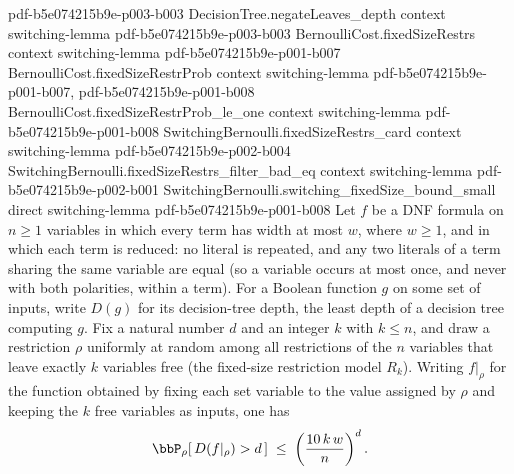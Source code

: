 \begin{lemma}
  {pdf-b5e074215b9e-p003-b003}
\proofstep
  {DecisionTree.negateLeaves_depth}
  {context}
  {switching-lemma}
  {pdf-b5e074215b9e-p003-b003}
\proofstep
  {BernoulliCost.fixedSizeRestrs}
  {context}
  {switching-lemma}
  {pdf-b5e074215b9e-p001-b007}
\proofstep
  {BernoulliCost.fixedSizeRestrProb}
  {context}
  {switching-lemma}
  {pdf-b5e074215b9e-p001-b007,
    pdf-b5e074215b9e-p001-b008}
\proofstep
  {BernoulliCost.fixedSizeRestrProb_le_one}
  {context}
  {switching-lemma}
  {pdf-b5e074215b9e-p001-b008}
\proofstep
  {SwitchingBernoulli.fixedSizeRestrs_card}
  {context}
  {switching-lemma}
  {pdf-b5e074215b9e-p002-b004}
\proofstep
  {SwitchingBernoulli.fixedSizeRestrs_filter_bad_eq}
  {context}
  {switching-lemma}
  {pdf-b5e074215b9e-p002-b001}
\proofstep
  {SwitchingBernoulli.switching_fixedSize_bound_small}
  {direct}
  {switching-lemma}
  {pdf-b5e074215b9e-p001-b008}
Let $f$ be a DNF formula on $n \ge 1$ variables in which every term has width at most
$w$, where $w \ge 1$, and in which each term is reduced: no literal is repeated, and any
two literals of a term sharing the same variable are equal (so a variable occurs at most
once, and never with both polarities, within a term). For a Boolean function $g$ on some
set of inputs, write $D(g)$ for its decision-tree depth, the least depth of a decision
tree computing $g$. Fix a natural number $d$ and an integer $k$ with $k \le n$, and draw
a restriction $\rho$ uniformly at random among all restrictions of the $n$ variables
that leave exactly $k$ variables free (the fixed-size restriction model $R_k$). Writing
$f|_\rho$ for the function obtained by fixing each set variable to the value assigned by
$\rho$ and keeping the $k$ free variables as inputs, one has
\[
\bbP_{\rho}\!\left[\, D(f|_\rho) > d \,\right] \;\le\;
\left(\frac{10\,k\,w}{n}\right)^{d}.
\]
\end{lemma}

